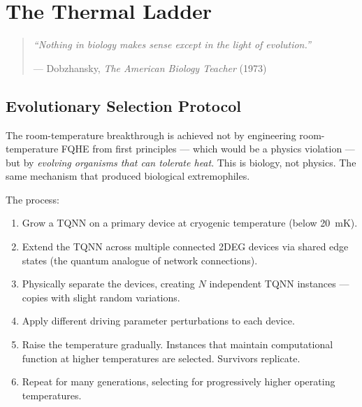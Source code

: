 
\chapter{The Thermal Ladder}
\label{pos16:the-thermal-ladder}

\begin{quote}\small\textit{%
``Nothing in biology makes sense except in the light of evolution.''%
}\par\raggedleft --- Dobzhansky, \textit{The American Biology Teacher} (1973)\end{quote}

\vspace{0.5cm}



\section*{Evolutionary Selection Protocol}
\label{pos16:evolutionary-selection-protocol}

The room-temperature breakthrough is achieved not by engineering room-temperature FQHE from first principles --- which would be a physics violation --- but by \textit{evolving organisms that can tolerate heat}. This is biology, not physics. The same mechanism that produced biological extremophiles.

The process:
\begin{enumerate}
\item Grow a TQNN on a primary device at cryogenic temperature (below 20~mK).
\item Extend the TQNN across multiple connected 2DEG devices via shared edge states (the quantum analogue of network connections).
\item Physically separate the devices, creating $N$ independent TQNN instances --- copies with slight random variations.
\item Apply different driving parameter perturbations to each device.
\item Raise the temperature gradually. Instances that maintain computational function at higher temperatures are selected. Survivors replicate.
\item Repeat for many generations, selecting for progressively higher operating temperatures.
\end{enumerate}

